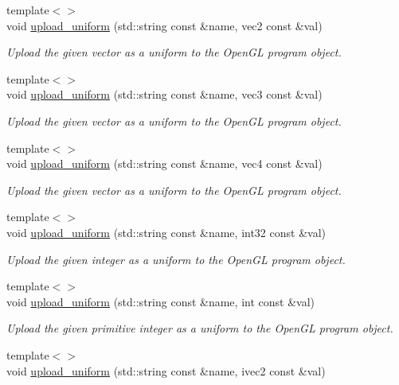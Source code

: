 \begin{DoxyCompactItemize}
{\footnotesize template$<$$>$ }\\void \hyperlink{classgfx_1_1program_a98aa73f11960573d78f8d80c71160d7e}{upload\-\_\-uniform} (std\-::string const \&name, vec2 const \&val)
\begin{DoxyCompactList}\small\item\em Upload the given vector as a uniform to the Open\-G\-L program object. \end{DoxyCompactList}\item 
{\footnotesize template$<$$>$ }\\void \hyperlink{classgfx_1_1program_a6c4bb82effb1e19d8becca1a28b6974b}{upload\-\_\-uniform} (std\-::string const \&name, vec3 const \&val)
\begin{DoxyCompactList}\small\item\em Upload the given vector as a uniform to the Open\-G\-L program object. \end{DoxyCompactList}\item 
{\footnotesize template$<$$>$ }\\void \hyperlink{classgfx_1_1program_ac793a14e1f7891ff840b44c322f48e98}{upload\-\_\-uniform} (std\-::string const \&name, vec4 const \&val)
\begin{DoxyCompactList}\small\item\em Upload the given vector as a uniform to the Open\-G\-L program object. \end{DoxyCompactList}\item 
{\footnotesize template$<$$>$ }\\void \hyperlink{classgfx_1_1program_a3e1e89ed2a5053d03134e16cef7efc35}{upload\-\_\-uniform} (std\-::string const \&name, int32 const \&val)
\begin{DoxyCompactList}\small\item\em Upload the given integer as a uniform to the Open\-G\-L program object. \end{DoxyCompactList}\item 
{\footnotesize template$<$$>$ }\\void \hyperlink{classgfx_1_1program_ad9557bb105ae536e08e602918bc43440}{upload\-\_\-uniform} (std\-::string const \&name, int const \&val)
\begin{DoxyCompactList}\small\item\em Upload the given primitive integer as a uniform to the Open\-G\-L program object. \end{DoxyCompactList}\item 
{\footnotesize template$<$$>$ }\\void \hyperlink{classgfx_1_1program_adaed8e864d24f21b0818ced33d842bce}{upload\-\_\-uniform} (std\-::string const \&name, ivec2 const \&val)

\end{DoxyCompactItemize}
